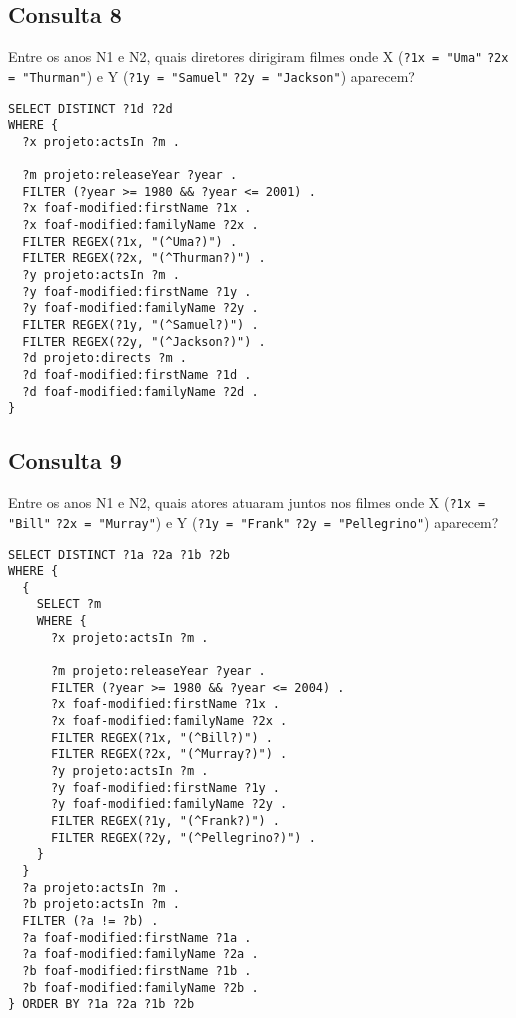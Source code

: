 \documentclass{article}
\newcommand{\code}[1]{\lstinline[mathescape=true]{#1}}
\begin{document}
\subsection{Consulta 8}
Entre os anos N1 e N2, quais diretores dirigiram filmes onde X (\code{?1x = "Uma"} \code{?2x = "Thurman"}) e Y (\code{?1y = "Samuel"} \code{?2y = "Jackson"}) aparecem?
\begin{lstlisting}[basicstyle=\ttfamily,frame=single]
SELECT DISTINCT ?1d ?2d
WHERE {
  ?x projeto:actsIn ?m .
  
  ?m projeto:releaseYear ?year .
  FILTER (?year >= 1980 && ?year <= 2001) .
  ?x foaf-modified:firstName ?1x .
  ?x foaf-modified:familyName ?2x .
  FILTER REGEX(?1x, "(^Uma?)") .
  FILTER REGEX(?2x, "(^Thurman?)") .
  ?y projeto:actsIn ?m .
  ?y foaf-modified:firstName ?1y .
  ?y foaf-modified:familyName ?2y .
  FILTER REGEX(?1y, "(^Samuel?)") .
  FILTER REGEX(?2y, "(^Jackson?)") .
  ?d projeto:directs ?m .
  ?d foaf-modified:firstName ?1d .
  ?d foaf-modified:familyName ?2d .
}
\end{lstlisting}
\subsection{Consulta 9}
Entre os anos N1 e N2, quais atores atuaram juntos nos filmes onde X (\code{?1x = "Bill"} \code{?2x = "Murray"}) e Y (\code{?1y = "Frank"} \code{?2y = "Pellegrino"}) aparecem?
\begin{lstlisting}[basicstyle=\ttfamily,frame=single]
SELECT DISTINCT ?1a ?2a ?1b ?2b
WHERE {
  {
    SELECT ?m
    WHERE {
      ?x projeto:actsIn ?m .
      
      ?m projeto:releaseYear ?year .
      FILTER (?year >= 1980 && ?year <= 2004) .
      ?x foaf-modified:firstName ?1x .
      ?x foaf-modified:familyName ?2x .
      FILTER REGEX(?1x, "(^Bill?)") .
      FILTER REGEX(?2x, "(^Murray?)") .
      ?y projeto:actsIn ?m .
      ?y foaf-modified:firstName ?1y .
      ?y foaf-modified:familyName ?2y .
      FILTER REGEX(?1y, "(^Frank?)") .
      FILTER REGEX(?2y, "(^Pellegrino?)") .
    }
  }
  ?a projeto:actsIn ?m .
  ?b projeto:actsIn ?m .
  FILTER (?a != ?b) .
  ?a foaf-modified:firstName ?1a .
  ?a foaf-modified:familyName ?2a . 
  ?b foaf-modified:firstName ?1b .
  ?b foaf-modified:familyName ?2b .
} ORDER BY ?1a ?2a ?1b ?2b
\end{lstlisting}
\end{document}

